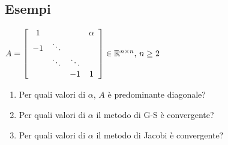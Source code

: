 \documentclass[10pt]{book}
\begin{document}
\subsection{Esempi}
\begin{multicols}{2}
	\begin{center}
		\begin{math}
		A = \left[
			\begin{array}{c c c c}
			1 & & &\alpha\\
			-1 & \ddots\\
			& \ddots & \ddots\\
			& & -1 & 1
			\end{array}
		\right]
		\in \mathbb{R}^{n \times n}
		\text{, } n \geq 2
		\end{math}
		\columnbreak
		\begin{enumerate}
			\item Per quali valori di $\alpha$, $A$ è predominante diagonale?
			\item Per quali valori di $\alpha$ il metodo di G-S è convergente?
			\item Per quali valori di $\alpha$ il metodo di Jacobi è convergente?
		\end{enumerate}
	\end{center}
\end{multicols}
\end{document}
